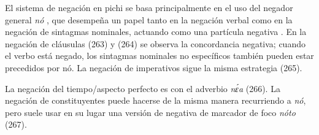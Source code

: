 El sistema de negación en pichi se basa principalmente en el uso del negador general {\setmainfont{Charis SIL} \textit{nó}} , que desempeña un papel tanto en la negación verbal como en la negación de sintagmas nominales, actuando como una partícula negativa \textcolor{MidnightBlue}{\citep{pichi}}. En la negación de cláusulas (263) y (264) se observa la concordancia negativa; cuando el verbo está negado, los sintagmas nominales no específicos también pueden estar precedidos por nó. La negación de imperativos sigue la misma estrategia (265).

La negación del tiempo/aspecto perfecto es con el adverbio {\setmainfont{Charis SIL} \textit{nɛ́a}} (266). La negación de constituyentes puede hacerse de la misma manera recurriendo a {\setmainfont{Charis SIL} \textit{nó}}, pero suele usar en su lugar una versión de negativa de marcador de foco {\setmainfont{Charis SIL} \textit{nóto}} (267).